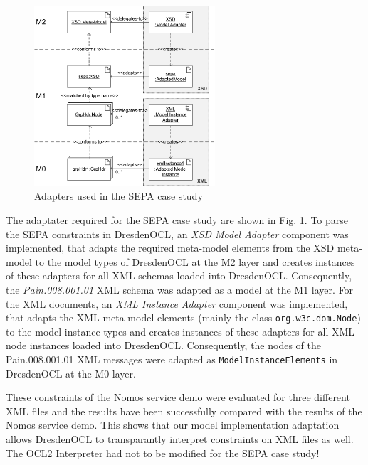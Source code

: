 \begin{figure}[!t]
	\centering
		\includegraphics[width=0.60\textwidth]{figures/casestudy02.pdf}
	\caption{Adapters used in the SEPA case study
	  }
	\label{fig:casestudy02}
\end{figure}

The adaptater required for the SEPA case study are shown in Fig.
\ref{fig:casestudy02}. To parse the SEPA constraints
in DresdenOCL, an \textit{XSD Model Adapter} component was implemented, that 
adapts the required meta-model elements from the XSD meta-model to the model 
types of DresdenOCL at the M2 layer and creates instances of these adapters for all 
XML schemas loaded into DresdenOCL. 
Consequently, the \textit{Pain.008.001.01} XML schema was adapted as a model at the M1 layer.
 For the XML
documents, an \textit{XML Instance Adapter} component was implemented, that
adapts the XML meta-model elements (mainly the class \texttt{org.w3c.dom.Node}) to the model instance types and creates instances of these adapters for all XML node instances
loaded into DresdenOCL. Consequently, the nodes of the Pain.008.001.01 XML messages
were adapted as \texttt{ModelInstanceElements} in DresdenOCL at the M0 layer.

These constraints of the Nomos service demo were evaluated for three different XML files 
and the results have been successfully compared with the results of the Nomos service demo.
This shows that our model implementation adaptation allows DresdenOCL to transparantly interpret
constraints on XML files as well. The OCL2 Interpreter had not to be modified for the SEPA case study!


